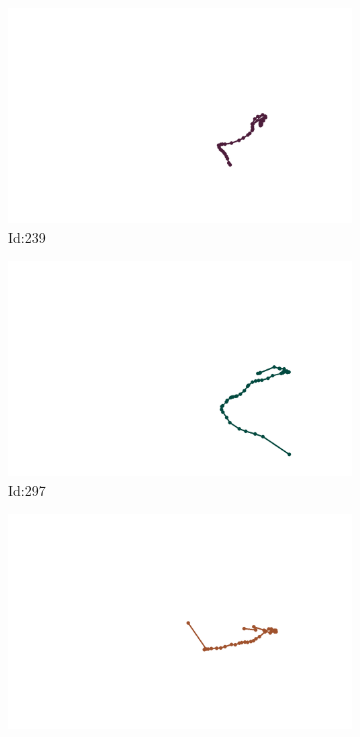 \documentclass[12pt,twoside]{report}
\begin{document}
\begin{figure}
\centering
\begin{subfigure}[b]{0.20\textwidth}
\centering
\includegraphics[width=\textwidth]{../../trajectories/239.png}
\caption{Id:239}
\end{subfigure}
\begin{subfigure}[b]{0.20\textwidth}
\centering
\includegraphics[width=\textwidth]{../../trajectories/297.png}
\caption{Id:297}
\end{subfigure}
\begin{subfigure}[b]{0.20\textwidth}
\centering
\includegraphics[width=\textwidth]{../../trajectories/345.png}

\end{subfigure}
\end{figure}
\end{document}

